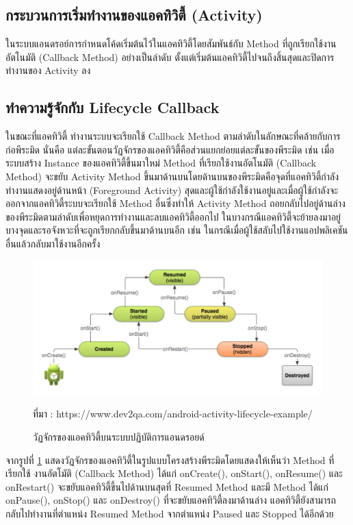 	\subsection{กระบวนการเริ่มทำงานของแอคทิวิตี้ (Activity)}
	ในระบบแอนดรอย์การกำหนดโค้ดเริ่มต้นไว้ในแอคทิวิตี้โดยสัมพันธ์กับ Method ที่ถูกเรียกใช้งานอัตโนมัติ (Callback Method) อย่างเป็นลำดับ ตั้งแต่เริ่มต้นแอคทิวิตี้ไปจนถึงสิ้นสุดและปิดการทำงานของ Activity ลง
	
	\subsection{ทำความรู้จักกับ Lifecycle Callback}
	ในขณะที่แอคทิวิตี้ \cite{ActivityLifeCycle} ทำงานระบบจะเรียกใช้ Callback Method ตามลำดับในลักษณะที่คล้ายกับการก่อพีระมิด นั่นคือ แต่ละขั้นตอนวัฏจักรของแอคทิวิตี้คือส่วนแยกย่อยแต่ละขั้นของพีระมิด
	เช่น เมื่อระบบสร้าง Instance ของแอคทิวิตี้ขึ้นมาใหม่ Method ที่เรียกใช้งานอัตโนมัติ (Callback Method) จะขยับ Activity Method ขึ้นมาด้านบนโดยด้านบนของพีระมิดคือจุดที่แอคทิวิตี้กำลังทำงานแสดงอยู่ด้านหน้า (Foreground Activity) สุดและผู้ใช้กำลังใช้งานอยู่และเมื่อผู้ใช้กำลังจะออกจากแอคทิวิตี้ระบบจะเรียกใช้ Method อื่นซึ่งทำให้ Activity Method
	ถอยกลับไปอยู่ด้านล่างของพีระมิดตามลำดับเพื่อหยุดการทำงานและลบแอคทิวิตี้ออกไป ในบางกรณีแอคทิวิตี้จะย้ายลงมาอยู่บางจุดและรอจังหวะที่จะถูกเรียกกลับขึ้นมาด้านบนอีก เช่น ในกรณีเมื่อผู้ใช้สลับไปใช้งานแอปพลิเคชันอื่นแล้วกลับมาใช้งานอีกครั้ง
	\begin{figure}[H]
		\centering
		\includegraphics[width=0.8\columnwidth]{Figures/2/lifecycle}
		\caption{วัฏจักรของแอคทิวิตี้บนระบบปฏิบัติการแอนดรอยด์}{ที่มา : https://www.dev2qa.com/android-activity-lifecycle-example/}
		\label{Fig:lifecycle}
	\end{figure}
	จากรูปที่ \ref{Fig:lifecycle} แสดงวัฏจักรของแอคทิวิตี้ในรูปแบบโครงสร้างพีระมิดโดยแสดงให้เห็นว่า Method ที่เรียกใช้
	งานอัตโมัติ (Callback Method) ได้แก่ onCreate(), onStart(), onResume() และ onRestart() จะขยับแอคทิวิตี้ขึ้นไปด้านบนสุดที่ Resumed Method
	และมี Method ได้แก่ onPause(), onStop() และ onDestroy() ที่จะขยับแอคทิวิตี้ลงมาด้านล่าง แอคทิวิตี้ยังสามารถกลับไปทำงานที่ตำแหน่ง Resumed Method จากตำแหน่ง Paused และ Stopped ได้อีกด้วย
	
